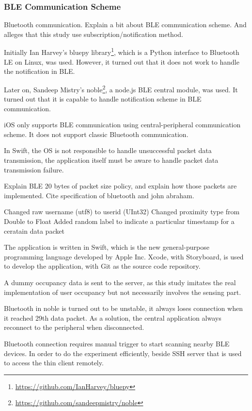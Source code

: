 \documentclass[journal]{vgtc}                %
\begin{document}

\subsubsection{BLE Communication Scheme} %
\label{ssub:ble_communication_scheme}
Bluetooth communication.
Explain a bit about BLE communication scheme.
And alleges that this study use subscription/notification method.

Initially Ian Harvey's bluepy library\footnote{\url{https://github.com/IanHarvey/bluepy}}, which is a Python interface to Bluetooth LE on Linux, was used. However, it turned out that it does not work to handle the notification in BLE.

Later on, Sandeep Mistry's noble\footnote{\url{https://github.com/sandeepmistry/noble}}, a node.js BLE central module, was used. It turned out that it is capable to handle notification scheme in BLE communication.

iOS only supports BLE communication using central-peripheral communication scheme. It does not support classic Bluetooth communication.

In Swift, the OS is not responsible to handle unsuccessful packet data transmission, the application itself must be aware to handle packet data transmission failure.

Explain BLE 20 bytes of packet size policy, and explain how those packets are implemented. Cite specification of bluetooth and john abraham.

Changed raw username (utf8) to userid (UInt32)
Changed proximity type from Double to Float
Added random label to indicate a particular timestamp for a ceratain data packet

The application is written in Swift, which is the new general-purpose programming language developed by Apple Inc. Xcode, with Storyboard, is used to develop the application, with Git as the source code repository.

A dummy occupancy data is sent to the server, as this study imitates the real implementation of user occupancy but not necessarily involves the sensing part.

Bluetooth in noble is turned out to be unstable, it always loses connection when it reached 29th data packet. As a solution, the central application always reconnect to the peripheral when disconnected.

Bluetooth connection requires manual trigger to start scanning nearby BLE devices. In order to do the experiment efficiently, beside SSH server that is used to access the thin client remotely. 
\end{document}
